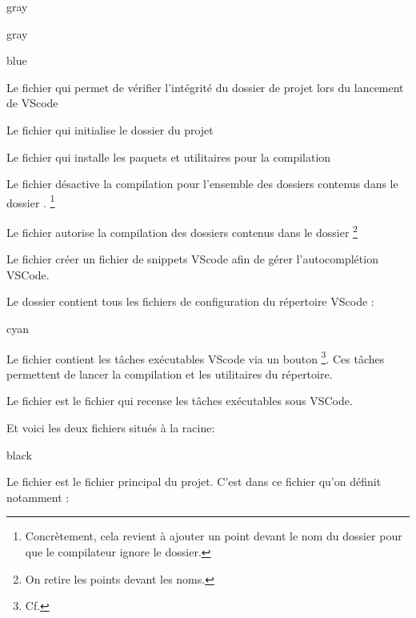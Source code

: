 \begin{items}{gray}{\faFolder}
\begin{items}{gray}{\faFolder}
        \begin{items}{blue}{}
            \item Le fichier  qui permet de vérifier l'intégrité du dossier de projet lors du lancement de VScode
            \item Le fichier  qui initialise le dossier du projet
            \item Le fichier  qui installe les paquets et utilitaires pour la compilation
            \item Le fichier  désactive la compilation pour l'ensemble des dossiers contenus 
            dans le dossier . \footnote{Concrètement, cela revient à ajouter un point devant le nom du 
            dossier pour que le compilateur ignore le dossier.}
            \item Le fichier  autorise la compilation des dossiers contenus dans le dossier \footnote{On retire les points devant les noms.}
            \item Le fichier  créer un fichier de snippets VScode
            afin de gérer l'autocomplétion VSCode. 
        \end{items}


    \end{items}

    \item Le dossier  contient tous les fichiers de configuration du répertoire VScode : 
    \begin{items}{cyan}{}

        \item Le fichier  contient les tâches exécutables VScode via un bouton \footnote{Cf. }. Ces tâches permettent de lancer la compilation et les utilitaires du répertoire.
        \item Le fichier  est le fichier qui recense les tâches exécutables sous VSCode.
    \end{items}


    Et voici les deux fichiers situés à la racine: 
    \begin{items}{black}{\Triangle}

        \item Le fichier  est le fichier principal du projet. C'est dans ce fichier qu'on définit notamment :


\end{items}
\end{items}
